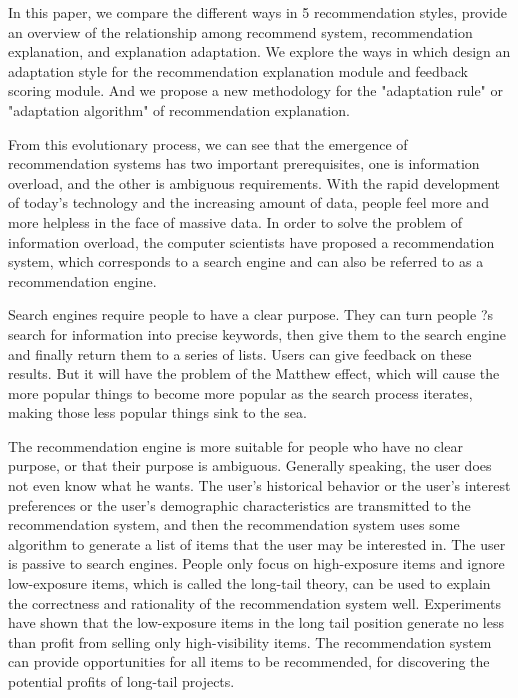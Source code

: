 \par In this paper, we compare the different ways in 5 recommendation styles, provide an overview of the relationship among recommend system, recommendation explanation, and explanation adaptation. We explore the ways in which design an adaptation style for the recommendation explanation module and feedback scoring module. And we propose a new methodology for the "adaptation rule" or "adaptation algorithm" of recommendation explanation.
\par From this evolutionary process, we can see that the emergence of recommendation systems has two important prerequisites, one is information overload, and the other is ambiguous requirements. With the rapid development of today's technology and the increasing amount of data, people feel more and more helpless in the face of massive data. In order to solve the problem of information overload, the computer scientists have proposed a recommendation system, which corresponds to a search engine and can also be referred to as a recommendation engine.
\par Search engines require people to have a clear purpose. They can turn people ?s search for information into precise keywords, then give them to the search engine and finally return them to a series of lists. Users can give feedback on these results. But it will have the problem of the Matthew effect\cite{merton1968matthew}, which will cause the more popular things to become more popular as the search process iterates, making those less popular things sink to the sea.
\par The recommendation engine is more suitable for people who have no clear purpose, or that their purpose is ambiguous. Generally speaking, the user does not even know what he wants. The user's historical behavior or the user's interest preferences or the user's demographic characteristics are transmitted to the recommendation system, and then the recommendation system uses some algorithm to generate a list of items that the user may be interested in. The user is passive to search engines. People only focus on high-exposure items and ignore low-exposure items, which is called the long-tail theory\cite{anderson2004long}, can be used to explain the correctness and rationality of the recommendation system well. Experiments have shown that the low-exposure items in the long tail position generate no less than profit from selling only high-visibility items. The recommendation system can provide opportunities for all items to be recommended, for discovering the potential profits of long-tail projects.
